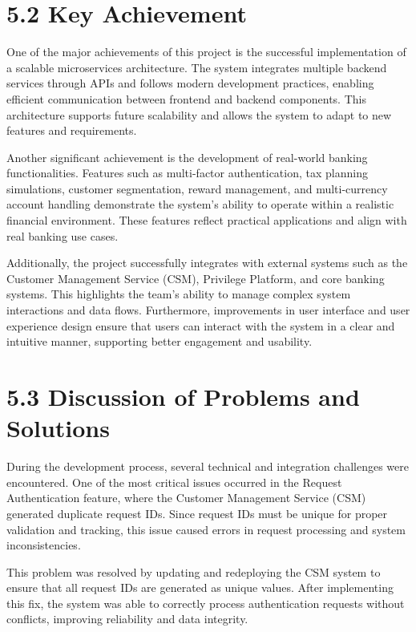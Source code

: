 \section{\texorpdfstring{\textbf{5.2 Key
Achievement}}{5.2 Key Achievement}}\label{key-achievement}

One of the major achievements of this project is the successful
implementation of a scalable microservices architecture. The system
integrates multiple backend services through APIs and follows modern
development practices, enabling efficient communication between frontend
and backend components. This architecture supports future scalability
and allows the system to adapt to new features and requirements.

Another significant achievement is the development of real-world banking
functionalities. Features such as multi-factor authentication, tax
planning simulations, customer segmentation, reward management, and
multi-currency account handling demonstrate the system's ability to
operate within a realistic financial environment. These features reflect
practical applications and align with real banking use cases.

Additionally, the project successfully integrates with external systems
such as the Customer Management Service (CSM), Privilege Platform, and
core banking systems. This highlights the team's ability to manage
complex system interactions and data flows. Furthermore, improvements in
user interface and user experience design ensure that users can interact
with the system in a clear and intuitive manner, supporting better
engagement and usability.

\section{\texorpdfstring{\textbf{5.3 Discussion of Problems and
Solutions}}{5.3 Discussion of Problems and Solutions}}\label{discussion-of-problems-and-solutions}

During the development process, several technical and integration
challenges were encountered. One of the most critical issues occurred in
the Request Authentication feature, where the Customer Management
Service (CSM) generated duplicate request IDs. Since request IDs must be
unique for proper validation and tracking, this issue caused errors in
request processing and system inconsistencies.

This problem was resolved by updating and redeploying the CSM system to
ensure that all request IDs are generated as unique values. After
implementing this fix, the system was able to correctly process
authentication requests without conflicts, improving reliability and
data integrity.


